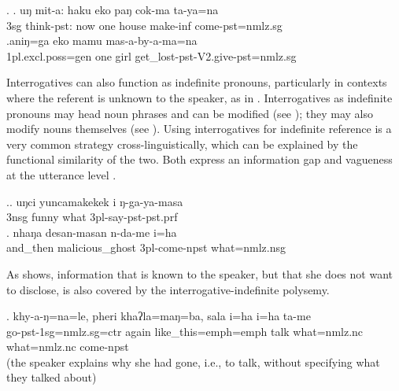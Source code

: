 \ex. \ag. uŋ mit-a:       haku eko paŋ  cok-ma    ta-ya=na\\
		{\sc 3sg} think{\sc [3sg]-pst}: now one house{\sc } make-{\sc inf} come{\sc [3sg]-pst=nmlz.sg}	\\
	 
\bg.aniŋ=ga  eko mamu mas-a-by-a-ma=na\\
{\sc 1pl.excl.poss=gen} one girl get\_lost{\sc [3sg]-pst-V2.give-pst=nmlz.sg}\\
	 


Interrogatives can also function as indefinite pronouns, particularly in contexts where the referent is unknown to the speaker, as in \Next. Interrogatives as indefinite pronouns may head noun phrases and can be modified (see \Next[a]); they may also modify nouns themselves (see \Next[b]). Using interrogatives for indefinite reference is a very common strategy cross-linguistically, which can be explained by the functional similarity of the two. Both express an information gap and vagueness at the utterance level \citep[170]{Haspelmath1997_Indefinite}. 

 \ex.\ag. uŋci yuncamakekek i ŋ-ga-ya-masa\\
{\sc 3nsg} funny what {\sc 3pl-}say{\sc -pst-pst.prf}\\
  
 \bg. nhaŋa   desan-masan  n-da-me      i=ha \\
 and\_then malicious\_ghost {\sc 3pl-}come{\sc -npst} what{\sc =nmlz.nsg}\\
  
 
 As \Next shows,  information that is known to the speaker, but that she does not want to disclose, is also covered by the interrogative-indefinite polysemy.
 
  \exg. khy-a-ŋ=na=le,                           pheri khaʔla=maŋ=ba,        sala   i=ha                i=ha                ta-me\\
 go{\sc -pst-1sg=nmlz.sg=ctr} again like\_this{\sc =emph=emph} talk what{\sc =nmlz.nc} what{\sc =nmlz.nc} come{\sc [3sg]-npst} \\
  (the speaker explains why she had gone, i.e., to talk, without specifying what they talked about) 
 
